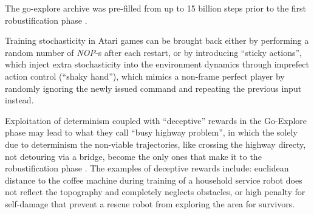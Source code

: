 \documentclass{article}
\begin{document}
The go-explore archive was pre-filled from up to 15 billion steps prior to the first
robustification phase \citep[p.~19]{ecoffet_first_2021}.

Training stochasticity in Atari games can be brought back either by performing a random
number of \emph{NOP}-s after each restart, or by introducing ``sticky actions'', which
inject extra stochasticity into the environment dynamics through imprefect action control
(``shaky hand''), which mimics a non-frame perfect player by randomly ignoring the newly
issued command and repeating the previous input instead.

Exploitation of determinism coupled with ``deceptive'' rewards in the Go-Explore phase
may lead to what they call ``busy highway problem'', in which the solely due to determinism
the non-viable trajectories, like crossing the highway directy, not detouring via a bridge,
become the only ones that make it to the robustification phase
\citep[p.~17]{ecoffet_go-explore_2021}.
% 
The examples of deceptive rewards include: euclidean distance to the coffee machine during
training of a household service robot does not reflect the topography and completely
neglects obstacles, or high penalty for self-damage that prevent a rescue robot from
exploring the area for survivors.

\end{document}
